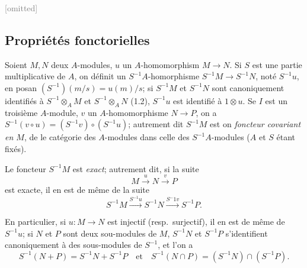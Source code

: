 \documentclass[oneside,10pt,french]{memoir}
\begin{document}
\textcolor{gray}{[omitted]}

\setcounter{subsection}{2}
\subsection{Propri\'et\'es fonctorielles}

\begin{node}
  Soient $M, N$ deux $A$-modules, $u$ un $A$-homomorphism $M\to N$. Si $S$ est
  une partie multiplicative de $A$, on d\'efinit un $S^{-1}A$-homorphisme
  $S^{-1}M\to S^{-1}N$, not\'e $S^{-1}u$, en posan $(S^{-1})(m/s) = u(m)/s$; si
  $S^{-1}M$ et $S^{-1}N$ sont canoniquement identifi\'es \`a
  $S^{-1}\otimes_{A}M$ et $S^{-1}\otimes_{A}N$ (1.2),
  $S^{-1}u$ est identifi\'e \`a $1\otimes u$. Se $I$ est un troisi\`eme
  $A$-module, $v$ un $A$-homomorphisme $N\to P$, on a $S^{-1}(v\circ u) =
  (S^{-1}v)\circ (S^{-1}u)$; autrement dit $S^{-1}M$ est on \emph{foncteur
  covariant en $M$}, de le cat\'egorie des $A$-modules dans celle des
  $S^{-1}A$-modules ($A$ et $S$ \'etant fix\'es).
\end{node}

\begin{node}
  Le foncteur $S^{-1}M$ est \emph{exact}; autrement dit, si la suite
  \begin{equation}
    M\xrightarrow{u} N\xrightarrow{v} P
  \end{equation}
  est exacte, il en est de m\^eme de la suite
  \begin{equation}
    S^{-1}M\xrightarrow{S^{-1}u}S^{-1}N\xrightarrow{S^-1v}S^{-1}P.
  \end{equation}

  En particulier, si $u:M\to N$ est injectif (resp.\ surjectif), il en est de
  m\^eme de $S^{-1}u$; si $N$ et $P$ sont deux sou-modules de $M$, $S^{-1}N$ et
  $S^{-1}P$ s'identifient canoniquement \`a des sous-modules de $S^{-1}$, et
  l'on a
  \begin{equation}
    S^{-1}(N+P) = S^{-1}N+S^{-1}P\quad\text{et}\quad S^{-1}(N\cap P) = (S^{-1}N)\cap(S^{-1}P).
  \end{equation}

\end{node}

\nocite{*}
\printbibliography
\end{document}
